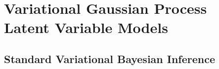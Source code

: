 
 \section{\label{section:vgplvm}Variational Gaussian Process Latent Variable Models}
 \subsection{\label{section:vgplvmBound} Standard Variational Bayesian Inference}



